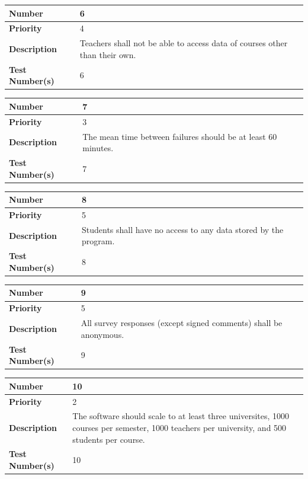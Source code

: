 \documentclass{article}
\begin{document}
\begin{center}
\bigskip
{}
\begin{tabular}{|p{3.5cm}|p{7.5cm}|} 
\hline
\textbf{Number} & 6  \\
\hline
\textbf{Priority} & 4\\ 
\hline
\textbf{Description} & Teachers shall not be able to access data of courses other than their own. \\ 
\hline
\textbf{Test Number(s) }& 6 \\ 
\hline
\end{tabular}


\bigskip
\vspace{1in}
\begin{tabular}{|p{3.5cm}|p{7.5cm}|} 
\hline
\textbf{Number} & 7  \\
\hline
\textbf{Priority} & 3\\ 
\hline
\textbf{Description} & The mean time between failures should be at least 60 minutes. \\ 
\hline
\textbf{Test Number(s) }& 7 \\ 
\hline
\end{tabular}


\bigskip
{}
\begin{tabular}{|p{3.5cm}|p{7.5cm}|} 
\hline
\textbf{Number} & 8  \\
\hline
\textbf{Priority} & 5\\ 
\hline
\textbf{Description} & Students shall have no access to any data stored by the program. \\ 
\hline
\textbf{Test Number(s) }& 8 \\ 
\hline
\end{tabular}


\bigskip
{}
\begin{tabular}{|p{3.5cm}|p{7.5cm}|} 
\hline
\textbf{Number} & 9  \\
\hline
\textbf{Priority} & 5 \\ 
\hline
\textbf{Description} & All survey responses (except signed \newline comments) shall be anonymous. \\ 
\hline
\textbf{Test Number(s) }& 9 \\ 
\hline
\end{tabular}


\bigskip
{}
\begin{tabular}{|p{3.5cm}|p{7.5cm}|} 
\hline
\textbf{Number} & 10  \\
\hline
\textbf{Priority} & 2\\ 
\hline
\textbf{Description} & The software should scale to at least three universites, 1000 courses per semester, 1000 teachers per university, and 500 students per course. \\ 
\hline
\textbf{Test Number(s) }& 10 \\ 
\hline
\end{tabular}



\end{center}
\end{document}

